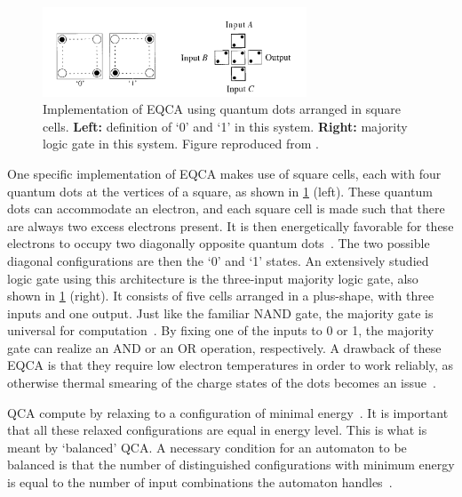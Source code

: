 \documentclass[11pt,a4paper,english,twoside]{article}
\begin{document}
\begin{figure}[b!]
    \centering
    \includegraphics[width=0.7\textwidth]{Figures/Introduction/QCA_DigitalLogicGate - Figure 1ab.png}
    \caption{Implementation of EQCA using quantum dots arranged in square cells. \textbf{Left:} definition of `0' and `1' in this system. \textbf{Right:} majority logic gate in this system. Figure reproduced from \cite{QCA_DigitalLogicGate}.}
    \label{fig:Intro_EQCA}
\end{figure}
One specific implementation of EQCA makes use of square cells, each with four quantum dots at the vertices of a square, as shown in \cref{fig:Intro_EQCA} (left). These quantum dots can accommodate an electron, and each square cell is made such that there are always two excess electrons present. It is then energetically favorable for these electrons to occupy two diagonally opposite quantum dots~\cite{QCA_DigitalLogicGate}. The two possible diagonal configurations are then the `0' and `1' states. An extensively studied logic gate using this architecture is the three-input majority logic gate, also shown in \cref{fig:Intro_EQCA} (right). It consists of five cells arranged in a plus-shape, with three inputs and one output. Just like the familiar NAND gate, the majority gate is universal for computation~\cite{NML_Carlton}. By fixing one of the inputs to 0 or 1, the majority gate can realize an AND or an OR operation, respectively. A drawback of these EQCA is that they require low electron temperatures in order to work reliably, as otherwise thermal smearing of the charge states of the dots becomes an issue~\cite{QCA_DigitalLogicGate}. \par
QCA compute by relaxing to a configuration of minimal energy~\cite{QCA_Algorithms}. It is important that all these relaxed configurations are equal in energy level. This is what is meant by `balanced' QCA. A necessary condition for an automaton to be balanced is that the number of distinguished configurations with minimum energy is equal to the number of input combinations the automaton handles~\cite{QCA_Algorithms}.
\end{document}
